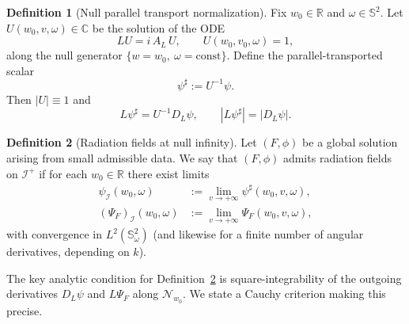 \documentclass[11pt]{article}
\numberwithin{equation}{section}
\theoremstyle{plain}
\theoremstyle{definition}
\newtheorem{definition}{Definition}[section]
\theoremstyle{remark}
\begin{document}
\begin{definition}[Null parallel transport normalization]\label{def:parallel-transport}
Fix $w_0\in\mathbb{R}$ and $\omega\in\mathbb{S}^2$.
Let $U(w_0,v,\omega)\in \mathbb{C}$ be the solution of the ODE
\begin{equation}\label{eq:U-transport}
L U = i\,A_L\,U,\qquad U(w_0,v_0,\omega)=1,
\end{equation}
along the null generator $\{w=w_0,\ \omega=\mathrm{const}\}$.
Define the parallel-transported scalar
\begin{equation}\label{eq:psi-sharp}
\psi^\sharp := U^{-1}\psi.
\end{equation}
Then $|U|\equiv 1$ and
\begin{equation}\label{eq:Lpsi-sharp}
L\psi^\sharp = U^{-1}D_L\psi,\qquad |L\psi^\sharp| = |D_L\psi|.
\end{equation}
\end{definition}

\begin{definition}[Radiation fields at null infinity]\label{def:radiation-fields}
Let $(F,\phi)$ be a global solution arising from small admissible data.
We say that $(F,\phi)$ admits radiation fields on $\mathcal{I}^+$ if for each $w_0\in\mathbb{R}$ there exist limits
\begin{eqnarray}
\psi_{\mathcal{I}}(w_0,\omega)
&:=\lim_{v\to+\infty}\psi^\sharp(w_0,v,\omega),
\label{eq:radfield-psi}
\\
(\Psi_F)_{\mathcal{I}}(w_0,\omega)
&:=\lim_{v\to+\infty}\Psi_F(w_0,v,\omega),
\label{eq:radfield-max}
\end{eqnarray}
with convergence in $L^2(\mathbb{S}^2_\omega)$ (and likewise for a finite number of angular derivatives, depending on $k$).
\end{definition}

The key analytic condition for Definition~\ref{def:radiation-fields} is square-integrability of the outgoing derivatives $D_L\psi$ and $L\Psi_F$ along $\mathcal{N}_{w_0}$.
We state a Cauchy criterion making this precise.
\end{document}
